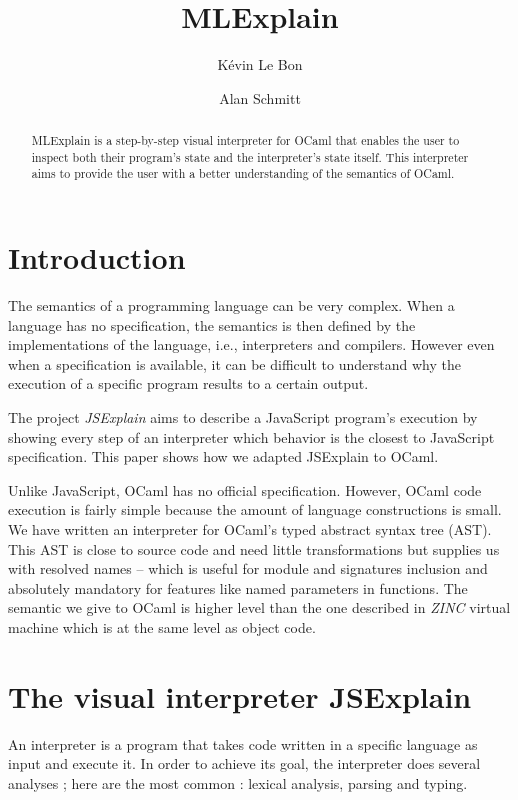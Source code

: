 \documentclass[twocolumn]{article}
\author{
	K\'evin Le Bon
	\and
	Alan Schmitt
}
\title{MLExplain}
\begin{document}
\maketitle

\begin{abstract}
	MLExplain is a step-by-step visual interpreter for OCaml that enables the user
	to inspect both their program's state and the interpreter's state itself. This interpreter
	aims to provide the user with a better understanding of the semantics of OCaml.
\end{abstract}

\section{Introduction}

The semantics of a programming language can be very complex. When a language has no specification,
the semantics is then defined by the implementations of the language, i.e., interpreters and
compilers. However even when a specification is available, it can be difficult to understand why
the execution of a specific program results to a certain output.

The project \emph{JSExplain} \cite{chargueraud:hal-01745792} aims to describe
a JavaScript program's execution by showing every step of an interpreter which behavior is the
closest to JavaScript specification. This paper shows how we adapted JSExplain to OCaml.

Unlike JavaScript, OCaml has no official specification. However, OCaml code execution is
fairly simple because the amount of language constructions is small. We have written an
interpreter for OCaml's typed abstract syntax tree (AST). This AST is close to source code and
need little transformations but supplies us with resolved names -- which is useful for module and
signatures inclusion and absolutely mandatory for features like named parameters in functions.
The semantic we give to OCaml is higher level than the one described in \emph{ZINC}
\cite{Leroy-ZINC} virtual machine which is at the same level as object code.

\section{The visual interpreter JSExplain}

An interpreter is a program that takes code written in a specific language as input
and execute it. In order to achieve its goal, the interpreter does several analyses ;
here are the most common : lexical analysis, parsing and typing.
\end{document}
